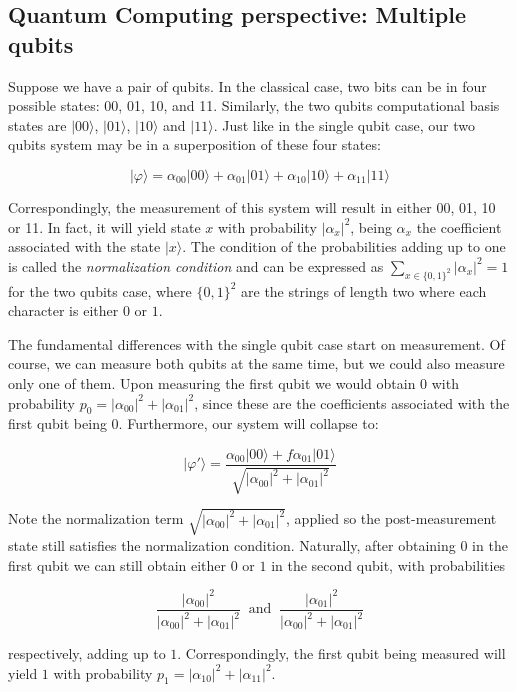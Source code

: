 \subsection{Quantum Computing perspective: Multiple qubits}


Suppose we have a pair of qubits. In the classical case, two bits can be in four possible states: 00, 01, 10, and 11. Similarly, the two qubits computational basis states are $|00\rangle$, $|01\rangle$, $|10\rangle$ and $|11\rangle$. Just like in the single qubit case, our two qubits system may be in a superposition of these four states:

$$ |\varphi\rangle = \alpha_{00} |00\rangle + \alpha_{01} |01\rangle + \alpha_{10} |10\rangle + \alpha_{11} |11\rangle $$

Correspondingly, the measurement of this system will result in either 00, 01, 10 or 11. In fact, it will yield state $x$ with probability $|\alpha_x|^2$, being $\alpha_x$ the coefficient associated with the state $|x\rangle$. The condition of the probabilities adding up to one is called the \emph{normalization condition} and can be expressed as $\sum_{x \in \{0,1\}^2} |\alpha_x|^2 = 1$ for the two qubits case, where $\{0,1\}^2$ are the strings of length two where each character is either $0$ or $1$.

The fundamental differences with the single qubit case start on measurement. Of course, we can measure both qubits at the same time, but we could also measure only one of them. Upon measuring the first qubit we would obtain $0$ with probability $p_0 = |\alpha_{00}|^2 + |\alpha_{01}|^2$, since these are the coefficients associated with the first qubit being $0$. Furthermore, our system will collapse to:

$$ |\varphi'\rangle = \frac{ \alpha_{00} |00\rangle +f \alpha_{01} |01\rangle }{ \sqrt{|\alpha_{00}|^2 + |\alpha_{01}|^2} } $$

Note the normalization term $\sqrt{|\alpha_{00}|^2 + |\alpha_{01}|^2}$, applied so the post-measurement state still satisfies the normalization condition. Naturally, after obtaining $0$ in the first qubit we can still obtain either $0$ or $1$ in the second qubit, with probabilities 

$$ \frac{ |\alpha_{00}|^2 }{ |\alpha_{00}|^2 + |\alpha_{01}|^2 }  \ \text{ and } \ 
\frac{ |\alpha_{01}|^2 }{ |\alpha_{00}|^2 + |\alpha_{01}|^2 } $$

respectively, adding up to $1$. Correspondingly, the first qubit being measured will yield $1$ with probability $p_1 = |\alpha_{10}|^2 + |\alpha_{11}|^2$.

